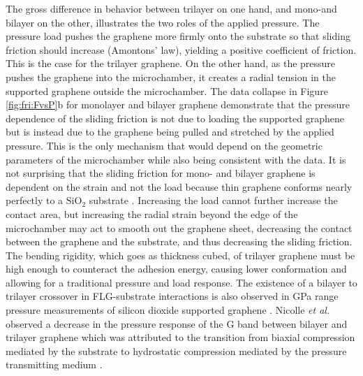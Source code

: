The gross difference in behavior between trilayer on one hand, and mono-and bilayer on the other, illustrates the two roles of the applied pressure.
The pressure load pushes the graphene more firmly onto the substrate so that sliding friction should increase (Amontons' law), yielding a positive coefficient of friction.
This is the case for the trilayer graphene.
On the other hand, as the pressure pushes the graphene into the microchamber, it creates a radial tension in the supported graphene outside the microchamber.
The data collapse in Figure \ref{fig:fri:FvsP}b for monolayer and bilayer graphene demonstrate that the pressure dependence of the sliding friction is not due to loading the supported graphene but is instead due to the graphene being pulled and stretched by the applied pressure.
This is the only mechanism that would depend on the geometric parameters of the microchamber while also being consistent with the data.
It is not surprising that the sliding friction for mono- and bilayer graphene is dependent on the strain and not the load because thin graphene conforms nearly perfectly to a $\mathrm{SiO_2}$ substrate \cite{Stolyarova2007,Lui2009,Cullen2010}.
Increasing the load cannot further increase the contact area, but increasing the radial strain beyond the edge of the microchamber may act to smooth out the graphene sheet, decreasing the contact between the graphene and the substrate, and thus decreasing the sliding friction.
The bending rigidity, which goes as thickness cubed, of trilayer graphene must be high enough to counteract the adhesion energy, causing lower conformation and allowing for a traditional pressure and load response.
The existence of a bilayer to trilayer crossover in FLG-substrate interactions is also observed in GPa range pressure measurements of silicon dioxide supported graphene \cite{Proctor2009,Nicolle2011}.
Nicolle \textit{et al.} observed a decrease in the pressure response of the G band between bilayer and trilayer graphene which was attributed to the transition from biaxial compression mediated by the substrate to hydrostatic compression mediated by the pressure transmitting medium \cite{Nicolle2011}.

